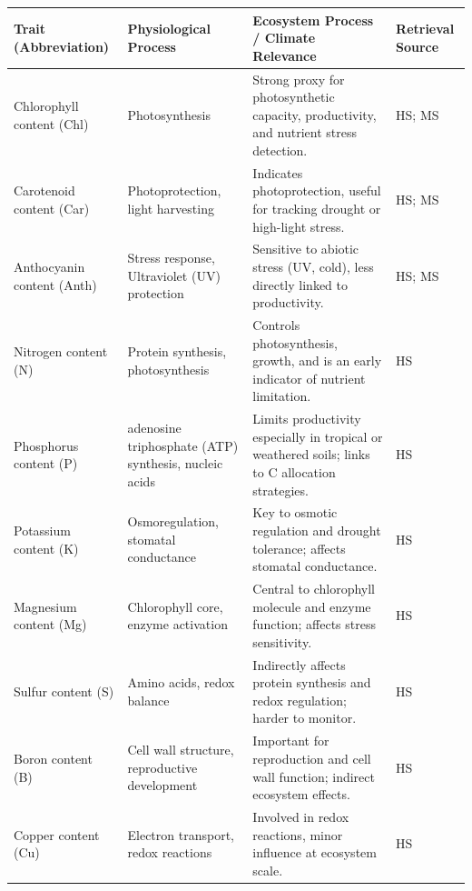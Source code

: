 \documentclass[pdflatex,sn-mathphys-num]{sn-jnl}%
\theoremstyle{thmstyleone}%
\theoremstyle{thmstyletwo}%
\theoremstyle{thmstylethree}%
\begin{document}
\renewcommand{\tabularxcolumn}[1]{>{\raggedright\arraybackslash}p{#1}}
\small
\begin{table}[htbp]
\begin{tabularx}{\textwidth}{
  p{}  %
  p{}  %
  p{}  %
  p{}  %
}
\toprule
\textbf{Trait (Abbreviation)} & \textbf{Physiological Process} & \textbf{Ecosystem Process / Climate Relevance} & \textbf{Retrieval Source} \\
\midrule
Chlorophyll content (Chl) & Photosynthesis & Strong proxy for photosynthetic capacity, productivity, and nutrient stress detection. & HS; MS\\
\midrule
Carotenoid content (Car) & Photoprotection, light harvesting & Indicates photoprotection, useful for tracking drought or high-light stress. & HS; MS\\
\midrule
Anthocyanin content (Anth) & Stress response, Ultraviolet (UV) protection & Sensitive to abiotic stress (UV, cold), less directly linked to productivity. & HS; MS \\
\midrule
Nitrogen content (N) & Protein synthesis, photosynthesis & Controls photosynthesis, growth, and is an early indicator of nutrient limitation. & HS\\
\midrule
Phosphorus content (P) & adenosine triphosphate (ATP) synthesis, nucleic acids & Limits productivity especially in tropical or weathered soils; links to C allocation strategies. & HS\\
\midrule
Potassium content (K) & Osmoregulation, stomatal conductance & Key to osmotic regulation and drought tolerance; affects stomatal conductance. & HS\\
\midrule
Magnesium content (Mg) & Chlorophyll core, enzyme activation & Central to chlorophyll molecule and enzyme function; affects stress sensitivity. & HS\\
\midrule
Sulfur content (S) & Amino acids, redox balance & Indirectly affects protein synthesis and redox regulation; harder to monitor. & HS\\
\midrule
Boron content (B) & Cell wall structure, reproductive development & Important for reproduction and cell wall function; indirect ecosystem effects. & HS\\
\midrule
Copper content (Cu) & Electron transport, redox reactions & Involved in redox reactions, minor influence at ecosystem scale. & HS\\

\end{tabularx}
\end{table}
\end{document}
